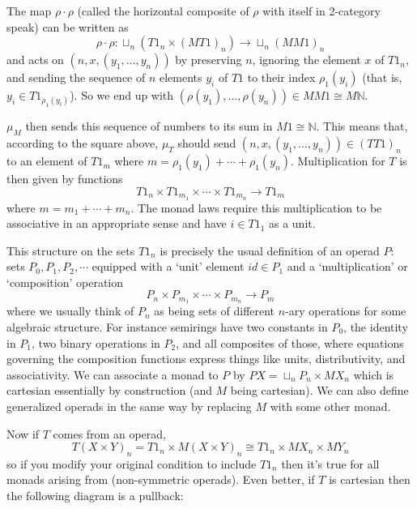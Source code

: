 \documentclass{amsart}
\begin{document}
\begin{center}\end{center}

The map $\rho \cdot \rho$ (called the horizontal composite of $\rho$ with itself in 2-category speak) can be written as $$\rho \cdot \rho : \sqcup_n (T1_n \times (MT1)_n) \to \sqcup_n (MM1)_n$$ and acts on $(n,x,(y_1,...,y_n))$ by preserving $n$, ignoring the element $x$ of $T1_n$, and sending the sequence of $n$ elements $y_i$ of $T1$ to their index $\rho_1(y_i)$ (that is, $y_i \in T1_{\rho_1(y_i)}$).  So we end up with $(\rho(y_1),...,\rho(y_n)) \in MM1 \cong M\mathbb{N}$.

$\mu_M$ then sends this sequence of numbers to its sum in $M1 \cong \mathbb{N}$.  This means that, according to the square above, $\mu_T$ should send $(n,x,(y_1,...,y_n)) \in (TT1)_n$ to an element of $T1_m$ where $m = \rho_1(y_1) + \cdots + \rho_1(y_n)$.  Multiplication for $T$ is then given by functions $$T1_n \times T1_{m_1} \times \cdots \times T1_{m_n} \to T1_m$$ where $m = m_1 + \cdots + m_n$.  The monad laws require this multiplication to be associative in an appropriate sense and have $i \in T1_1$ as a unit.

This structure on the sets $T1_n$ is precisely the usual definition of an operad $P$: sets $P_0,P_1,P_2,\cdots$ equipped with a `unit' element $id \in P_1$ and a `multiplication' or `composition' operation $$P_n \times P_{m_1} \times \cdots \times P_{m_n} \to P_m$$ where we usually think of $P_n$ as being sets of different $n$-ary operations for some algebraic structure. For instance semirings have two constants in $P_0$, the identity in $P_1$, two binary operations in $P_2$, and all composites of those, where equations governing the composition functions express things like units, distributivity, and associativity. We can associate a monad to $P$ by $PX = \sqcup_n P_n \times MX_n$ which is cartesian essentially by construction (and $M$ being cartesian).  We can also define generalized operads in the same way by replacing $M$ with some other monad.

Now if $T$ comes from an operad, $$T(X \times Y)_n = T1_n \times M(X \times Y)_n \cong T1_n \times MX_n \times MY_n$$ so if you modify your original condition to include $T1_n$ then it's true for all monads arising from (non-symmetric operads).  Even better, if $T$ is cartesian then the following diagram is a pullback:
\end{document}
